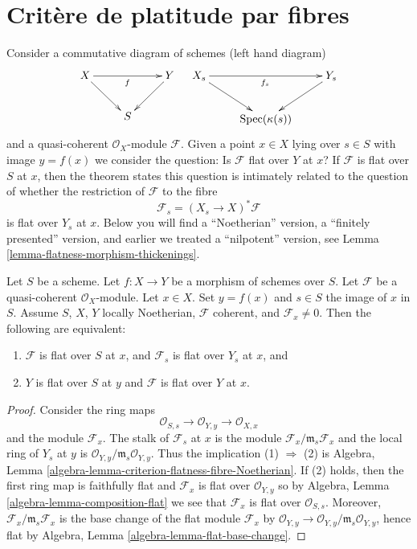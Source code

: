\section{Crit\`ere de platitude par fibres}
\label{section-criterion-flat-fibres}

\noindent
Consider a commutative diagram of schemes (left hand diagram)
$$
\xymatrix{
X \ar[rr]_f \ar[dr] & & Y \ar[dl] \\
& S
}
\quad
\xymatrix{
X_s \ar[rr]_{f_s} \ar[rd] & & Y_s \ar[dl] \\
& \Spec(\kappa(s))
}
$$
and a quasi-coherent $\mathcal{O}_X$-module $\mathcal{F}$.
Given a point $x \in X$ lying over $s \in S$ with image $y = f(x)$
we consider the question: Is $\mathcal{F}$ flat
over $Y$ at $x$? If $\mathcal{F}$ is flat over $S$ at $x$, then
the theorem states this question is intimately related to the
question of whether the restriction of $\mathcal{F}$ to the fibre
$$
\mathcal{F}_s = (X_s \to X)^*\mathcal{F}
$$
is flat over $Y_s$ at $x$. Below you will find a ``Noetherian'' version,
a ``finitely presented'' version, and earlier we treated a ``nilpotent''
version, see
Lemma \ref{lemma-flatness-morphism-thickenings}.

\begin{theorem}
\label{theorem-criterion-flatness-fibre-Noetherian}
Let $S$ be a scheme.
Let $f : X \to Y$ be a morphism of schemes over $S$.
Let $\mathcal{F}$ be a quasi-coherent $\mathcal{O}_X$-module.
Let $x \in X$. Set $y = f(x)$ and $s \in S$ the image of $x$ in $S$.
Assume $S$, $X$, $Y$ locally Noetherian,
$\mathcal{F}$ coherent, and $\mathcal{F}_x \not = 0$.
Then the following are equivalent:
\begin{enumerate}
\item $\mathcal{F}$ is flat over $S$ at $x$, and
$\mathcal{F}_s$ is flat over $Y_s$ at $x$, and
\item $Y$ is flat over $S$ at $y$ and $\mathcal{F}$ is
flat over $Y$ at $x$.
\end{enumerate}
\end{theorem}

\begin{proof}
Consider the ring maps
$$
\mathcal{O}_{S, s} \longrightarrow
\mathcal{O}_{Y, y} \longrightarrow \mathcal{O}_{X, x}
$$
and the module $\mathcal{F}_x$. The stalk of $\mathcal{F}_s$ at $x$
is the module $\mathcal{F}_x/\mathfrak m_s \mathcal{F}_x$ and
the local ring of $Y_s$ at $y$ is
$\mathcal{O}_{Y, y}/\mathfrak m_s \mathcal{O}_{Y, y}$.
Thus the implication (1) $\Rightarrow$ (2) is
Algebra, Lemma \ref{algebra-lemma-criterion-flatness-fibre-Noetherian}.
If (2) holds, then the first ring map is faithfully flat
and $\mathcal{F}_x$ is flat over $\mathcal{O}_{Y, y}$ so by
Algebra, Lemma \ref{algebra-lemma-composition-flat}
we see that $\mathcal{F}_x$ is flat over $\mathcal{O}_{S, s}$.
Moreover, $\mathcal{F}_x/\mathfrak m_s \mathcal{F}_x$ is the
base change of the flat module $\mathcal{F}_x$ by
$\mathcal{O}_{Y, y} \to \mathcal{O}_{Y, y}/\mathfrak m_s \mathcal{O}_{Y, y}$,
hence flat by
Algebra, Lemma \ref{algebra-lemma-flat-base-change}.
\end{proof}

